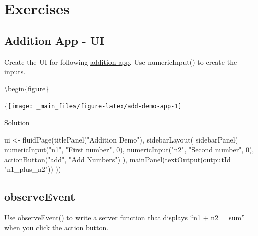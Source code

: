 \documentclass[
]{book}
\newenvironment{Shaded}{\begin{snugshade}}{\end{snugshade}}
\newcommand{\AttributeTok}[1]{\textcolor[rgb]{0.77,0.63,0.00}{#1}}
\newcommand{\DecValTok}[1]{\textcolor[rgb]{0.00,0.00,0.81}{#1}}
\newcommand{\FunctionTok}[1]{\textcolor[rgb]{0.00,0.00,0.00}{#1}}
\newcommand{\NormalTok}[1]{#1}
\newcommand{\OtherTok}[1]{\textcolor[rgb]{0.56,0.35,0.01}{#1}}
\newcommand{\StringTok}[1]{\textcolor[rgb]{0.31,0.60,0.02}{#1}}
\begin{document}
\hypertarget{exercises-first-app}{%
\section{Exercises}\label{exercises-first-app}}

\hypertarget{addition-app---ui}{%
\subsection{Addition App - UI}\label{addition-app---ui}}

Create the UI for following \href{https://shiny.psy.gla.ac.uk/debruine/add_demo/}{addition app}. Use numericInput() to create the inputs.

\textbackslash begin\{figure\}

\{\centering \href{https://shiny.psy.gla.ac.uk/debruine/add_demo/}{\texttt{[image: \_main\_files/figure-latex/add-demo-app-1]} }

Solution

\begin{Shaded}
\begin{Highlighting}[]
\NormalTok{ui }\OtherTok{\textless{}{-}} \FunctionTok{fluidPage}\NormalTok{(}\FunctionTok{titlePanel}\NormalTok{(}\StringTok{"Addition Demo"}\NormalTok{),}
                \FunctionTok{sidebarLayout}\NormalTok{(}
                  \FunctionTok{sidebarPanel}\NormalTok{(}
                    \FunctionTok{numericInput}\NormalTok{(}\StringTok{"n1"}\NormalTok{, }\StringTok{"First number"}\NormalTok{, }\DecValTok{0}\NormalTok{),}
                    \FunctionTok{numericInput}\NormalTok{(}\StringTok{"n2"}\NormalTok{, }\StringTok{"Second number"}\NormalTok{, }\DecValTok{0}\NormalTok{),}
                    \FunctionTok{actionButton}\NormalTok{(}\StringTok{"add"}\NormalTok{, }\StringTok{"Add Numbers"}\NormalTok{)}
\NormalTok{                  ),}
                  \FunctionTok{mainPanel}\NormalTok{(}\FunctionTok{textOutput}\NormalTok{(}\AttributeTok{outputId =} \StringTok{"n1\_plus\_n2"}\NormalTok{))}
\NormalTok{                ))}
\end{Highlighting}
\end{Shaded}

\hypertarget{observeevent}{%
\subsection{observeEvent}\label{observeevent}}

Use observeEvent() to write a server function that displays ``n1 + n2 = sum'' when you click the action button.
\end{document}
